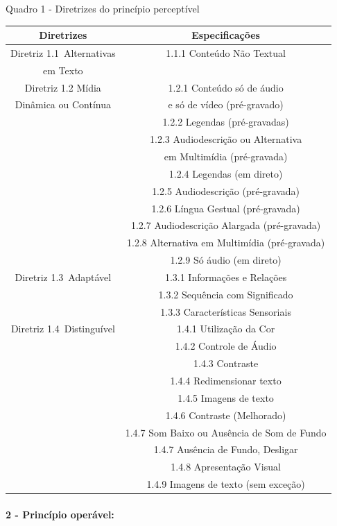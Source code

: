 \documentclass[a4paper]{article}
\begin{document}
\begin{titlepage}
Quadro 1 - Diretrizes do princípio perceptível\\[-1cm]
\begin{center}
	\begin{longtable}{|c|c|}
		\hline
		Diretrizes & Especificações \\
		\hline
		Diretriz 1.1 Alternativas& 1.1.1 Conteúdo Não Textual\\
		em Texto & \\
		\hline
		Diretriz 1.2 Mídia & 1.2.1 Conteúdo só de áudio\\
		Dinâmica ou Contínua & e só de vídeo (pré-gravado) \\
		& 1.2.2 Legendas (pré-gravadas)\\
		& 1.2.3 Audiodescrição ou Alternativa\\
		& em Multimídia (pré-gravada)\\
		& 1.2.4 Legendas (em direto)\\
		& 1.2.5 Audiodescrição (pré-gravada)\\
		& 1.2.6 Língua Gestual (pré-gravada)\\
		& 1.2.7 Audiodescrição Alargada (pré-gravada)\\
		& 1.2.8 Alternativa em Multimídia (pré-gravada)\\
		& 1.2.9 Só áudio (em direto)\\
		\hline
		Diretriz 1.3 Adaptável& 1.3.1 Informações e Relações\\
		& 1.3.2 Sequência com Significado\\
		& 1.3.3 Características Sensoriais\\
		\hline
		Diretriz 1.4 Distinguível& 1.4.1 Utilização da Cor\\
		& 1.4.2 Controle de Áudio\\
		& 1.4.3 Contraste\\
		& 1.4.4 Redimensionar texto\\
		& 1.4.5 Imagens de texto\\
		& 1.4.6 Contraste (Melhorado)\\
		& 1.4.7 Som Baixo ou Ausência de Som de Fundo\\
		& 1.4.7 Ausência de Fundo, Desligar\\
		& 1.4.8 Apresentação Visual\\
		& 1.4.9 Imagens de texto (sem exceção)\\
		\hline
	\end{longtable}
\end{center}

\paragraph{2 - Princípio operável: }


\end{titlepage}
\end{document}
